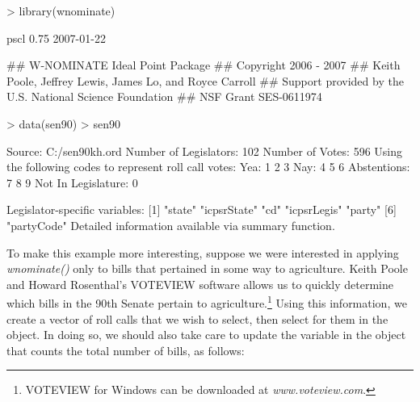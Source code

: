 \documentclass[12pt]{article}
\begin{document}
\begin{Schunk}
\begin{Sinput}
> library(wnominate)
\end{Sinput}
\begin{Soutput}
pscl 0.75 	 2007-01-22 

## W-NOMINATE Ideal Point Package 
## Copyright 2006 - 2007 
## Keith Poole, Jeffrey Lewis, James Lo, and Royce Carroll
## Support provided by the U.S. National Science Foundation
## NSF Grant SES-0611974
\end{Soutput}
\begin{Sinput}
> data(sen90)
> sen90
\end{Sinput}
\begin{Soutput}
Source:		 C:/sen90kh.ord 
Number of Legislators:	 102 
Number of Votes:	 596 
Using the following codes to represent roll call votes:
Yea:		 1 2 3 
Nay:		 4 5 6 
Abstentions:	 7 8 9 
Not In Legislature:	 0 

Legislator-specific variables:
[1] "state"      "icpsrState" "cd"         "icpsrLegis" "party"     
[6] "partyCode" 
Detailed information available via summary function.
\end{Soutput}
\end{Schunk}

To make this example more interesting, suppose we were interested
in applying \emph{wnominate()} only to bills that pertained in some
way to agriculture.  Keith Poole and Howard Rosenthal's VOTEVIEW software allows us to
quickly determine which bills in the 90th Senate pertain to
agriculture.\footnote{VOTEVIEW for Windows can be downloaded at \emph{www.voteview.com}.}
Using this information, we create a vector of roll calls that we wish
to select, then select for them in the \verb@rollcall@ object.  In doing
so, we should also take care to update the variable in the \verb@rollcall@
object that counts the total number of bills, as follows:
\end{document}
